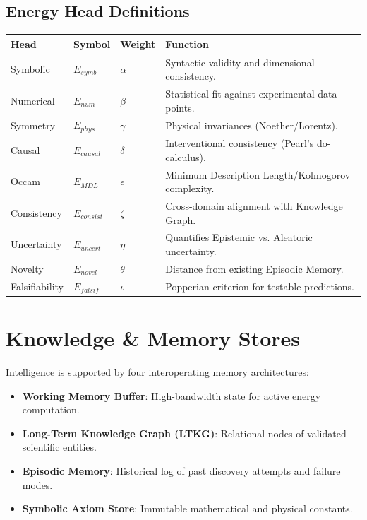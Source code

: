 \documentclass[11pt,a4paper]{article}
\begin{document}
\subsection{Energy Head Definitions}
\begin{table}[h!]
\centering
\small
\begin{tabular}{@{}llll@{}}
\toprule
\textbf{Head} & \textbf{Symbol} & \textbf{Weight} & \textbf{Function} \\ \midrule
Symbolic & $E_{symb}$ & $\alpha$ & Syntactic validity and dimensional consistency. \\
Numerical & $E_{num}$ & $\beta$ & Statistical fit against experimental data points. \\
Symmetry & $E_{phys}$ & $\gamma$ & Physical invariances (Noether/Lorentz). \\
Causal & $E_{causal}$ & $\delta$ & Interventional consistency (Pearl's do-calculus). \\
Occam & $E_{MDL}$ & $\epsilon$ & Minimum Description Length/Kolmogorov complexity. \\
Consistency & $E_{consist}$ & $\zeta$ & Cross-domain alignment with Knowledge Graph. \\
Uncertainty & $E_{uncert}$ & $\eta$ & Quantifies Epistemic vs. Aleatoric uncertainty. \\
Novelty & $E_{novel}$ & $\theta$ & Distance from existing Episodic Memory. \\
Falsifiability & $E_{falsif}$ & $\iota$ & Popperian criterion for testable predictions. \\ \bottomrule
\end{tabular}
\end{table}

\section{Knowledge \& Memory Stores}
Intelligence is supported by four interoperating memory architectures:
\begin{itemize}
    \item \textbf{Working Memory Buffer}: High-bandwidth state for active energy computation.
    \item \textbf{Long-Term Knowledge Graph (LTKG)}: Relational nodes of validated scientific entities.
    \item \textbf{Episodic Memory}: Historical log of past discovery attempts and failure modes.
    \item \textbf{Symbolic Axiom Store}: Immutable mathematical and physical constants.
\end{itemize}
\end{document}
